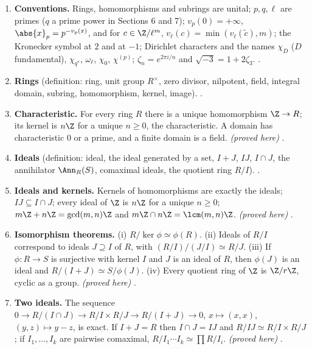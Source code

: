 \begin{enumerate}[label=\textbf{\thechapter.\arabic*}]
\item \textbf{Conventions.} Rings, homomorphisms and subrings are unital; $p,q,\ell$ are primes ($q$ a prime power in
Sections 6 and 7); $v_p(0)=+\infty$, $\abs{x}_p=p^{-v_p(x)}$, and for $c\in\Z/\ell^m$, $v_\ell(c)=\min(v_\ell(\tilde c),m)$; the Kronecker
symbol at $2$ and at $-1$; Dirichlet characters and the names $\chi_D$ ($D$ fundamental), $\chi_{q^*}$, $\omega_\ell$, $\chi_0$, $\chi^{(p)}$;
$\zeta_n=e^{2\pi i/n}$ and
$\sqrt{-3}=1+2\zeta_3$. .
\item \textbf{Rings} (definition: ring, unit group $R^\times$, zero divisor, nilpotent, field, integral domain, subring,
homomorphism, kernel, image). .
\item \textbf{Characteristic.} For every ring $R$ there is a unique homomorphism $\Z\to R$; its kernel is $n\Z$ for a unique
$n\ge0$, the characteristic. A domain has characteristic $0$ or a prime, and a finite domain is a field.
\emph{(proved here)} .
\item \textbf{Ideals} (definition: ideal, the ideal generated by a set, $I+J$, $IJ$, $I\cap J$, the annihilator $\Ann_R(S)$,
comaximal ideals, the quotient ring $R/I$). .
\item \textbf{Ideals and kernels.} Kernels of homomorphisms are exactly the ideals; $IJ\subseteq I\cap J$; every ideal of $\Z$ is
$n\Z$ for a unique $n\ge0$; $m\Z+n\Z=\gcd(m,n)\Z$ and $m\Z\cap n\Z=\lcm(m,n)\Z$. \emph{(proved here)} .
\item \textbf{Isomorphism theorems.} (i) $R/\ker\phi\simeq\phi(R)$. (ii) Ideals of $R/I$ correspond to ideals $J\supseteq I$ of $R$,
with $(R/I)/(J/I)\simeq R/J$. (iii) If $\phi\colon R\to S$ is surjective with kernel $I$ and $J$ is an ideal of $R$, then $\phi(J)$ is
an ideal and $R/(I+J)\simeq S/\phi(J)$. (iv) Every quotient ring of $\Z$ is $\Z/r\Z$, cyclic as a group. \emph{(proved here)}
.
\item \textbf{Two ideals.} The sequence $0\to R/(I\cap J)\to R/I\times R/J\to R/(I+J)\to0$, $x\mapsto(x,x)$, $(y,z)\mapsto y-z$, is
exact. If $I+J=R$ then $I\cap J=IJ$ and $R/IJ\simeq R/I\times R/J$; if $I_1,\dots,I_k$ are pairwise comaximal,
$R/I_1\cdots I_k\simeq\prod R/I_i$. \emph{(proved here)} .

\end{enumerate}

